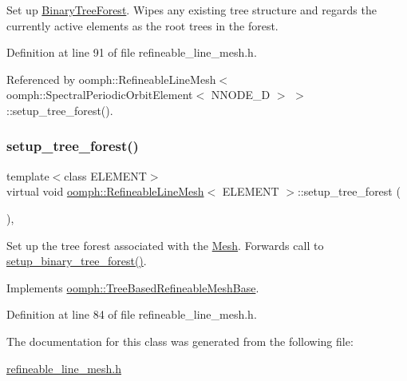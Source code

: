 Set up \hyperlink{classoomph_1_1BinaryTreeForest}{Binary\+Tree\+Forest}. Wipes any existing tree structure and regards the currently active elements as the root trees in the forest. 

Definition at line 91 of file refineable\+\_\+line\+\_\+mesh.\+h.



Referenced by oomph\+::\+Refineable\+Line\+Mesh$<$ oomph\+::\+Spectral\+Periodic\+Orbit\+Element$<$ N\+N\+O\+D\+E\+\_\+D $>$ $>$\+::setup\+\_\+tree\+\_\+forest().

\mbox{\label{classoomph_1_1RefineableLineMesh_a11ee25cace35f302fdf64b623906ea35}} 
\subsubsection{\texorpdfstring{setup\+\_\+tree\+\_\+forest()}{setup\_tree\_forest()}}
{\footnotesize\ttfamily template$<$class E\+L\+E\+M\+E\+NT$>$ \\
virtual void \hyperlink{classoomph_1_1RefineableLineMesh}{oomph\+::\+Refineable\+Line\+Mesh}$<$ E\+L\+E\+M\+E\+NT $>$\+::setup\+\_\+tree\+\_\+forest (\begin{DoxyParamCaption}{ }\end{DoxyParamCaption})\hspace{0.3cm}{\ttfamily [inline]}, {\ttfamily [virtual]}}



Set up the tree forest associated with the \hyperlink{classoomph_1_1Mesh}{Mesh}. Forwards call to \hyperlink{classoomph_1_1RefineableLineMesh_ac87ad1a1be6f9a9e444acea2e42598ff}{setup\+\_\+binary\+\_\+tree\+\_\+forest()}. 



Implements \hyperlink{classoomph_1_1TreeBasedRefineableMeshBase_aab7cbaa680b2258f2b1eea5de6bbe605}{oomph\+::\+Tree\+Based\+Refineable\+Mesh\+Base}.



Definition at line 84 of file refineable\+\_\+line\+\_\+mesh.\+h.



The documentation for this class was generated from the following file\+:\begin{DoxyCompactItemize}
\item 
\hyperlink{refineable__line__mesh_8h}{refineable\+\_\+line\+\_\+mesh.\+h}\end{DoxyCompactItemize}
